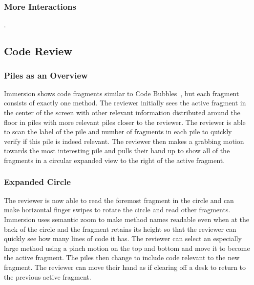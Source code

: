 \documentclass[conference]{IEEEtran}
\begin{document}
\subsubsection{More Interactions}.

\subsection{Code Review}


\subsubsection{Piles as an Overview}
Immersion shows code fragments similar to Code Bubbles~\cite{Bragdon:CodeBubbles}, but each fragment consists of exactly one method.  
The reviewer initially sees the active fragment in the center of the screen with other relevant information distributed around the floor in piles with more relevant piles closer to the reviewer. 
The reviewer is able to scan the label of the pile and number of fragments in each pile to quickly verify if this pile is indeed relevant. 
The reviewer then makes a grabbing motion towards the most interesting pile and pulls their hand up to show all of the fragments in a circular expanded view to the right of the active fragment.

\subsubsection{Expanded Circle}
The reviewer is now able to read the foremost fragment in the circle and can make horizontal finger swipes to rotate the circle and read other fragments. 
Immersion uses semantic zoom to make method names readable even when at the back of the circle and the fragment retains its height so that the reviewer can quickly see how many lines of code it has. 
The reviewer can select an especially large method using a pinch motion on the top and bottom and move it to become the active fragment. 
The piles then change to include code relevant to the new fragment. 
The reviewer can move their hand as if clearing off a desk to return to the previous active fragment.
\end{document}
